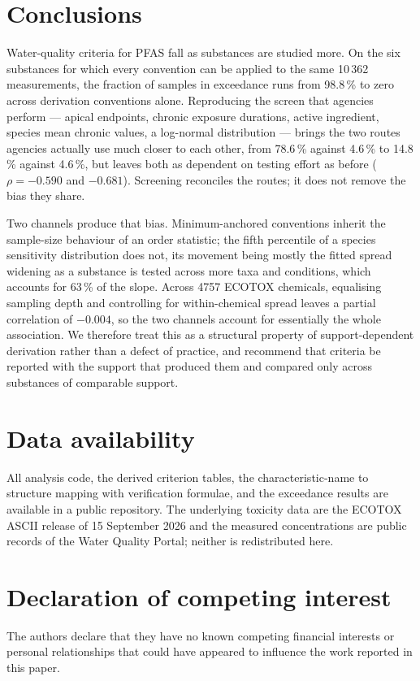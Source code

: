 \documentclass[preprint,12pt]{elsarticle}
\begin{document}
\section{Conclusions}

Water-quality criteria for PFAS fall as substances are studied more. On the six
substances for which every convention can be applied to the same 10\,362
measurements, the fraction of samples in exceedance runs from 98.8\,\% to zero
across derivation conventions alone. Reproducing the screen that agencies
perform --- apical endpoints, chronic exposure durations, active ingredient,
species mean chronic values, a log-normal distribution --- brings the two routes
agencies actually use much closer to each other, from 78.6\,\% against 4.6\,\%
to 14.8\,\% against 4.6\,\%, but leaves both as dependent on testing effort as
before ($\rho = -0.590$ and $-0.681$). Screening reconciles the routes; it does
not remove the bias they share.

Two channels produce that bias. Minimum-anchored conventions inherit the
sample-size behaviour of an order statistic; the fifth percentile of a species
sensitivity distribution does not, its movement being mostly the fitted spread
widening as a substance is tested across more taxa and conditions, which
accounts for 63\,\% of the slope. Across 4757 ECOTOX chemicals, equalising
sampling depth and controlling for within-chemical spread leaves a partial
correlation of $-0.004$, so the two channels account for essentially the whole
association. We therefore treat this as a structural property of
support-dependent derivation rather than a defect of practice, and recommend
that criteria be reported with the support that produced them and compared
only across substances of comparable support.

\section*{Data availability}
\label{sec:data}
All analysis code, the derived criterion tables, the characteristic-name to
structure mapping with verification formulae, and the exceedance results are
available in a public repository. The underlying toxicity data are the ECOTOX
ASCII release of 15 September 2026 and the measured concentrations are public
records of the Water Quality Portal; neither is redistributed here.

\section*{Declaration of competing interest}
The authors declare that they have no known competing financial interests or
personal relationships that could have appeared to influence the work reported in
this paper.
\end{document}
